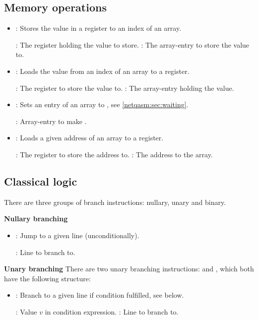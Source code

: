 \subsection{Memory operations}
\begin{itemize}
  \item {}: Stores the value in a register to an index of an array.

        : The register holding the value to store.
        : The array-entry to store the value to.
  \item {}: Loads the value from an index of an array to a register.

        : The register to store the value to.
        : The array-entry holding the value.
  \item {}: Sets an entry of an array to , see \cref{netqasm:sec:waiting}.

        : Array-entry to make .
  \item {}: Loads a given address of an array to a register.
  
        : The register to store the address to.
        : The address to the array.
\end{itemize}

\subsection{Classical logic}

There are three groups of branch instructions: nullary, unary and binary.

\textbf{Nullary branching}
\begin{itemize}
  \item {}: Jump to a given line (unconditionally).

        : Line to branch to.
\end{itemize}

\textbf{Unary branching}
There are two unary branching instructions:  and , which both have the following structure:
\begin{itemize}
  \item {}: Branch to a given line if condition fulfilled, see below.

        : Value $v$ in condition expression.
        : Line to branch to.
\end{itemize}

